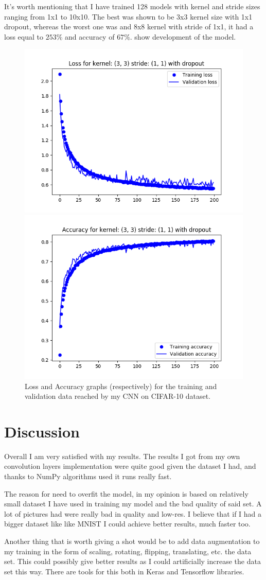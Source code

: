 \documentclass[conference]{IEEEtran}
\begin{document}
It's worth mentioning that I have trained 128 models with kernel and stride sizes ranging from 1x1 to 10x10. The best was shown to be 3x3 kernel size with 1x1 dropout, whereas the worst one was and 8x8 kernel with stride of 1x1, it had a loss equal to $253\%$ and accuracy of $67\%$.  show development of the model.

\begin{figure}[htbp]
  \centerline{\includegraphics[width=.4\textwidth]{Best_Loss}}
  \centerline{\includegraphics[width=.4\textwidth]{Best_Accuracy}}
  \caption{Loss and Accuracy graphs (respectively) for the training and validation data reached by my CNN on CIFAR-10 dataset.}
  \label{fig:LossAccCIFAR}
\end{figure}
\section{Discussion}
Overall I am very satisfied with my results. The results I got from my own convolution layers implementation were quite good given the dataset I had, and thanks to NumPy algorithms used it runs really fast.

The reason for need to overfit the model, in my opinion is based on relatively small dataset I have used in training my model and the bad quality of said set. A lot of pictures had were really bad in quality and low-res. I believe that if I had a bigger dataset like like MNIST I could achieve better results, much faster too.

Another thing that is worth giving a shot would be to add data augmentation to my training in the form of scaling, rotating, flipping, translating, etc. the data set. This could possibly give better results as I could artificially increase the data set this way. There are tools for this both in Keras and Tensorflow libraries.
\end{document}
